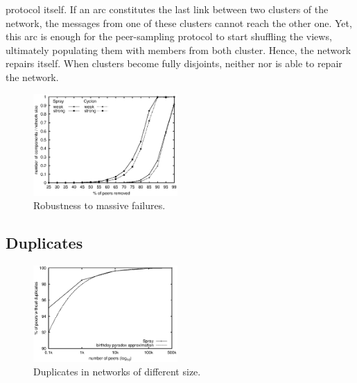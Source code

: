 \begin{asparadesc}
  protocol itself. If an arc constitutes the last link between two
  clusters of the network, the messages from one of these clusters
  cannot reach the other one. Yet, this arc is enough for the
  peer-sampling protocol to start shuffling the views, ultimately
  populating them with members from both cluster. Hence, the network
  repairs itself.  When clusters become fully disjoints, neither
  \CYCLON nor \SPRAY is able to repair the
  network.  %
\end{asparadesc}

\begin{figure}
  \centering
  \includegraphics[width=0.49\textwidth]{img/resilience.eps}
  \caption{\label{fig:resilience}Robustness to massive failures.}
\end{figure}




\subsection{Duplicates}

\begin{figure}
  \centering
  \includegraphics[width=0.49\textwidth]{img/duplicates.eps}
  \caption{\label{fig:duplicates}Duplicates in networks of different size.}
\end{figure}

